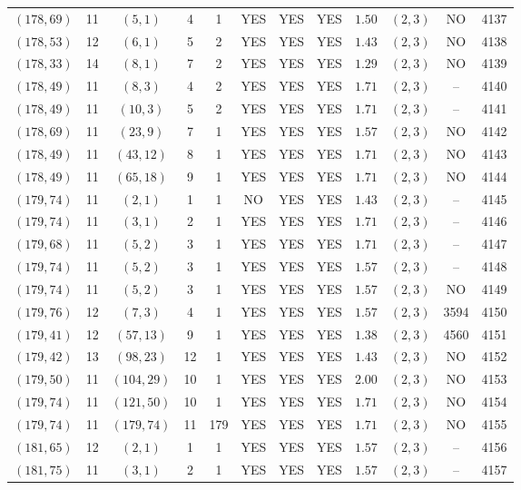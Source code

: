 \begin{longtable}{|c|c|c|c|c|c|c|c|c|c|c|c|}
$(178,69)$ & 11 & $(5,1)$ & 4 & 1 & YES & YES & YES & $1.50$ & $(2,3)$ & NO & 4137\\
$(178,53)$ & 12 & $(6,1)$ & 5 & 2 & YES & YES & YES & $1.43$ & $(2,3)$ & NO & 4138\\
$(178,33)$ & 14 & $(8,1)$ & 7 & 2 & YES & YES & YES & $1.29$ & $(2,3)$ & NO & 4139\\
$(178,49)$ & 11 & $(8,3)$ & 4 & 2 & YES & YES & YES & $1.71$ & $(2,3)$ & -- & 4140\\
$(178,49)$ & 11 & $(10,3)$ & 5 & 2 & YES & YES & YES & $1.71$ & $(2,3)$ & -- & 4141\\
$(178,69)$ & 11 & $(23,9)$ & 7 & 1 & YES & YES & YES & $1.57$ & $(2,3)$ & NO & 4142\\
$(178,49)$ & 11 & $(43,12)$ & 8 & 1 & YES & YES & YES & $1.71$ & $(2,3)$ & NO & 4143\\
$(178,49)$ & 11 & $(65,18)$ & 9 & 1 & YES & YES & YES & $1.71$ & $(2,3)$ & NO & 4144\\
$(179,74)$ & 11 & $(2,1)$ & 1 & 1 & NO & YES & YES & $1.43$ & $(2,3)$ & -- & 4145\\
$(179,74)$ & 11 & $(3,1)$ & 2 & 1 & YES & YES & YES & $1.71$ & $(2,3)$ & -- & 4146\\
$(179,68)$ & 11 & $(5,2)$ & 3 & 1 & YES & YES & YES & $1.71$ & $(2,3)$ & -- & 4147\\
$(179,74)$ & 11 & $(5,2)$ & 3 & 1 & YES & YES & YES & $1.57$ & $(2,3)$ & -- & 4148\\
$(179,74)$ & 11 & $(5,2)$ & 3 & 1 & YES & YES & YES & $1.57$ & $(2,3)$ & NO & 4149\\
$(179,76)$ & 12 & $(7,3)$ & 4 & 1 & YES & YES & YES & $1.57$ & $(2,3)$ & 3594 & 4150\\
$(179,41)$ & 12 & $(57,13)$ & 9 & 1 & YES & YES & YES & $1.38$ & $(2,3)$ & 4560 & 4151\\
$(179,42)$ & 13 & $(98,23)$ & 12 & 1 & YES & YES & YES & $1.43$ & $(2,3)$ & NO & 4152\\
$(179,50)$ & 11 & $(104,29)$ & 10 & 1 & YES & YES & YES & $2.00$ & $(2,3)$ & NO & 4153\\
$(179,74)$ & 11 & $(121,50)$ & 10 & 1 & YES & YES & YES & $1.71$ & $(2,3)$ & NO & 4154\\
$(179,74)$ & 11 & $(179,74)$ & 11 & 179 & YES & YES & YES & $1.71$ & $(2,3)$ & NO & 4155\\
$(181,65)$ & 12 & $(2,1)$ & 1 & 1 & YES & YES & YES & $1.57$ & $(2,3)$ & -- & 4156\\
$(181,75)$ & 11 & $(3,1)$ & 2 & 1 & YES & YES & YES & $1.57$ & $(2,3)$ & -- & 4157\\

\end{longtable}
